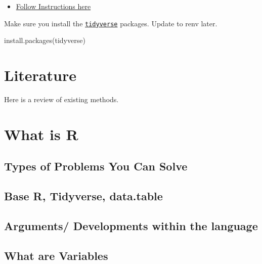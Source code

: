 \documentclass[
]{book}
\newenvironment{Shaded}{\begin{snugshade}}{\end{snugshade}}
\newcommand{\FunctionTok}[1]{\textcolor[rgb]{0.00,0.00,0.00}{#1}}
\newcommand{\NormalTok}[1]{#1}
\newcommand{\StringTok}[1]{\textcolor[rgb]{0.31,0.60,0.02}{#1}}
\providecommand{\tightlist}{%
  \setlength{\itemsep}{0pt}\setlength{\parskip}{0pt}}
\begin{document}
\begin{itemize}
  \begin{itemize}
  \tightlist
  \item
    \href{https://towardsdatascience.com/how-to-use-the-reddit-api-in-python-5e05ddfd1e5c}{Follow Instructions here}
  \end{itemize}
\end{itemize}

Make sure you install the \href{https://www.tidyverse.org/}{\texttt{tidyverse}} packages. Update to renv later.

\begin{Shaded}
\begin{Highlighting}[]
\FunctionTok{install.packages}\NormalTok{(}\StringTok{\textquotesingle{}tidyverse\textquotesingle{}}\NormalTok{)}
\end{Highlighting}
\end{Shaded}

\hypertarget{literature}{%
\chapter{Literature}\label{literature}}

Here is a review of existing methods.

\hypertarget{what-is-r}{%
\chapter{What is R}\label{what-is-r}}

\hypertarget{types-of-problems-you-can-solve}{%
\section{Types of Problems You Can Solve}\label{types-of-problems-you-can-solve}}

\hypertarget{base-r-tidyverse-data.table}{%
\section{Base R, Tidyverse, data.table}\label{base-r-tidyverse-data.table}}

\hypertarget{arguments-developments-within-the-language}{%
\section{Arguments/ Developments within the language}\label{arguments-developments-within-the-language}}

\hypertarget{what-are-variables}{%
\section{What are Variables}\label{what-are-variables}}
\end{document}

